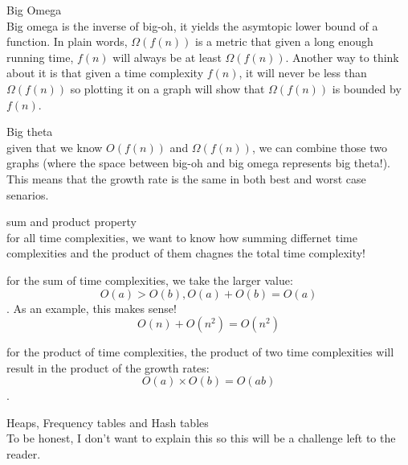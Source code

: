 \documentclass[journal, letterpaper]{IEEEtran}
\begin{document}
\begin{theory}{Big Omega}\\
    Big omega is the inverse of big-oh, it yields the asymtopic lower bound of a function.
    In plain words, $\Omega(f(n))$ is a metric that given a long enough running time,
    $f(n)$ will always be at least $\Omega(f(n))$. Another way to think about it is that
    given a time complexity $f(n)$, it will never be less than $\Omega(f(n))$ so plotting
    it on a graph will show that $\Omega(f(n))$ is bounded by $f(n)$.
\end{theory}

\begin{theory}{Big theta}\\
    given that we know $O(f(n))$ and $\Omega(f(n))$, we can combine those two graphs
    (where the space between big-oh and big omega represents big theta!). This means that
    the growth rate is the same in both best and worst case senarios.
\end{theory}

\begin{theory}{sum and product property}\\
    for all time complexities, we want to know how summing differnet time complexities and the product of them
    chagnes the total time complexity!

    for the sum of time complexities, we take the larger value: $$O(a) > O(b), O(a) + O(b)
    = O(a)$$. As an example, this makes sense! $$O(n) + O(n^2) = O(n^2)$$

    for the product of time complexities, the product of two time complexities will result
    in the product of the growth rates: $$O(a) \times O(b) = O(ab)$$.
\end{theory}

\begin{example}{Heaps, Frequency tables and Hash tables}\\
    To be honest, I don't want to explain this so this will be a challenge left to the
    reader.
\end{example}
\end{document}

